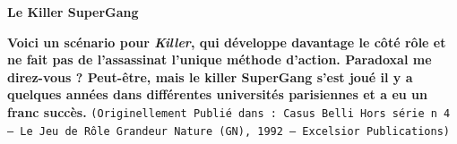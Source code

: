 \documentclass[11pt,twoside,a4paper]{article}
\title{\txtTITLE}
\date{ --- }
\def\txtTITLE{Le Killer SuperGang} %
\begin{document}
\setlength\parindent{0pt} %

\begin{center}
	\textbf{\huge \txtTITLE}
\end{center}


\textbf{\scriptsize Voici un sc{\'e}nario pour \emph{Killer}, qui d{\'e}veloppe davantage le c{\^o}t{\'e} r{\^o}le et ne fait pas de l'assassinat l'unique m{\'e}thode d'action. Paradoxal me direz-vous ? Peut-{\^e}tre, mais le killer SuperGang s'est jou{\'e} il y a quelques ann{\'e}es dans diff{\'e}rentes universit{\'e}s parisiennes et a eu un franc succ{\`e}s. } %
\texttt{\scriptsize{(Originellement Publi{\'e} dans : Casus Belli Hors s{\'e}rie n 4 -- Le Jeu de R{\^o}le Grandeur Nature (GN), 1992 -- Excelsior Publications)}}~\\
\end{document}
